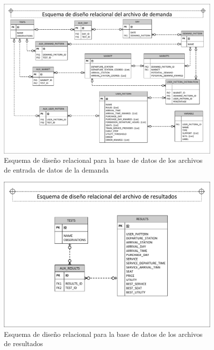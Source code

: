 \begin{figure}[H]
\centering
\includegraphics[width=1\textwidth]{fig/Bases de datos/EDR demanda V3.pdf}
\caption{Esquema de diseño relacional para la base de datos de los archivos de entrada de datos de la demanda}
\label{fig:edrDemanda}
\end{figure}

\begin{figure}[H]
\centering
\includegraphics[width=1\textwidth]{fig/Bases de datos/EDR Resultados.pdf}
\caption{Esquema de diseño relacional para la base de datos de los archivos de resultados}
\label{fig:edrResultados}
\end{figure}